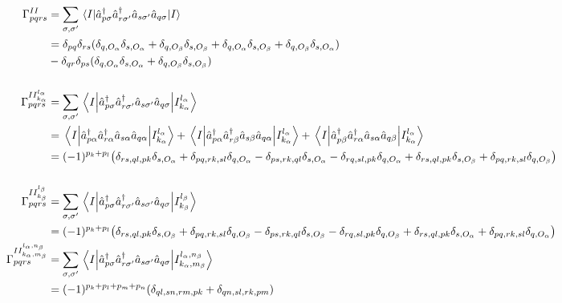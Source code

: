 \documentclass[11pt,a4paper]{article}
\newcommand{\kron}[1]{\delta_{#1}}
\newcommand{\oa}{O_{\alpha}}
\newcommand{\ob}{O_{\beta}}
\begin{document}
\begin{subequations}
  \label{eq:2RDM_nonzero}
  \begin{align}
    \Gamma_{pqrs}^{II} &= \sum_{\sigma,\sigma'}\mel{I}{\hat{a}_{p\sigma}^\dagger\hat{a}_{r\sigma'}^\dagger\hat{a}_{s\sigma'}\hat{a}_{q\sigma}}{I} \\
                       &= \delta_{pq}\delta_{rs}(\delta_{q,\oa} \delta_{s,\oa} + \delta_{q,\ob} \delta_{s,\ob}+ \delta_{q,\oa} \delta_{s,\ob} + \delta_{q,\ob} \delta_{s,\oa})\\
    &-\delta_{qr}\delta_{ps} (\delta_{q,\oa} \delta_{s,\oa} + \delta_{q,\ob} \delta_{s,\ob}) \notag \\
    \notag \\
    \Gamma_{pqrs}^{II_{k_\alpha}^{l_\alpha}} &= \sum_{\sigma,\sigma'}\mel{I}{\hat{a}_{p\sigma}^\dagger\hat{a}_{r\sigma'}^\dagger\hat{a}_{s\sigma'}\hat{a}_{q\sigma}}{I_{k_\alpha}^{l_\alpha}} \\
                       &=\mel{I}{\hat{a}_{p\alpha}^\dagger\hat{a}_{r\alpha}^\dagger\hat{a}_{s\alpha}\hat{a}_{q\alpha}}{I_{k_\alpha}^{l_\alpha}} + \mel{I}{\hat{a}_{p\alpha}^\dagger\hat{a}_{r\beta}^\dagger\hat{a}_{s\beta}\hat{a}_{q\alpha}}{I_{k_\alpha}^{l_\alpha}} + \mel{I}{\hat{a}_{p\beta}^\dagger\hat{a}_{r\alpha}^\dagger\hat{a}_{s\alpha}\hat{a}_{q\beta}}{I_{k_\alpha}^{l_\alpha}} \notag\\
                       &= (-1)^{p_k+p_l}\mleft(\kron{rs,ql,pk}\kron{s,\oa}+\kron{pq,rk,sl}\kron{q,\oa}-\kron{ps,rk,ql}\kron{s,\oa}-\kron{rq,sl,pk}\kron{q,\oa} + \kron{rs,ql,pk}\kron{s,\ob} + \kron{pq,rk,sl}\kron{q,\ob}\mright) \notag\\
    \notag \\
    \Gamma_{pqrs}^{II_{k_\beta}^{l_\beta}} &= \sum_{\sigma,\sigma'}\mel{I}{\hat{a}_{p\sigma}^\dagger\hat{a}_{r\sigma'}^\dagger\hat{a}_{s\sigma'}\hat{a}_{q\sigma}}{I_{k_\beta}^{l_\beta}} \\
                       &= (-1)^{p_k+p_l}\mleft(\kron{rs,ql,pk}\kron{s,\ob}+\kron{pq,rk,sl}\kron{q,\ob}-\kron{ps,rk,ql}\kron{s,\ob}-\kron{rq,sl,pk}\kron{q,\ob} + \kron{rs,ql,pk}\kron{s,\oa} + \kron{pq,rk,sl}\kron{q,\oa}\mright) \notag\\
    \Gamma_{pqrs}^{II_{k_\alpha,m_\beta}^{l_\alpha,n_\beta}} &= \sum_{\sigma,\sigma'}\mel{I}{\hat{a}_{p\sigma}^\dagger\hat{a}_{r\sigma'}^\dagger\hat{a}_{s\sigma'}\hat{a}_{q\sigma}}{I_{k_\alpha,m_\beta}^{l_\alpha,n_\beta}} \\
                       &= (-1)^{p_k+p_l+p_m+p_n}\mleft(\kron{ql,sn,rm,pk}+\kron{qn,sl,rk,pm} \mright)\notag\\

\end{align}
\end{subequations}
\end{document}
